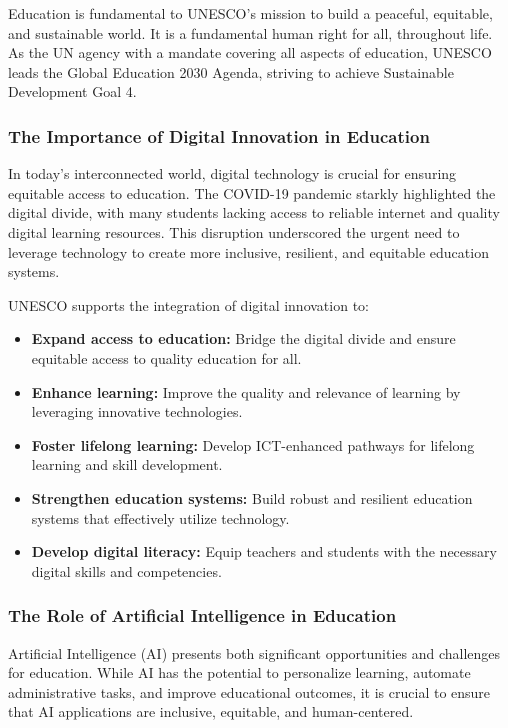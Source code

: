 \documentclass[a4paper,11pt]{article}
\begin{document}
Education is fundamental to UNESCO's mission to build a peaceful, equitable, and sustainable world. It is a fundamental human right for all, throughout life. As the UN agency with a mandate covering all aspects of education, UNESCO leads the Global Education 2030 Agenda, striving to achieve Sustainable Development Goal 4.
\cite{unesco-education-transforms-lives}

\subsubsection{The Importance of Digital Innovation in Education}

In today's interconnected world, digital technology is crucial for ensuring equitable access to education. The COVID-19 pandemic starkly highlighted the digital divide, with many students lacking access to reliable internet and quality digital learning resources. This disruption underscored the urgent need to leverage technology to create more inclusive, resilient, and equitable education systems.

UNESCO supports the integration of digital innovation to:
\begin{itemize}
	\item \textbf{Expand access to education:} Bridge the digital divide and ensure equitable access to quality education for all.
	\item \textbf{Enhance learning:} Improve the quality and relevance of learning by leveraging innovative technologies.
	\item \textbf{Foster lifelong learning:} Develop ICT-enhanced pathways for lifelong learning and skill development.
	\item \textbf{Strengthen education systems:} Build robust and resilient education systems that effectively utilize technology.
	\item \textbf{Develop digital literacy:} Equip teachers and students with the necessary digital skills and competencies.
\end{itemize}

\subsubsection{The Role of Artificial Intelligence in Education}

Artificial Intelligence (AI) presents both significant opportunities and challenges for education. While AI has the potential to personalize learning, automate administrative tasks, and improve educational outcomes, it is crucial to ensure that AI applications are inclusive, equitable, and human-centered.
\end{document}
